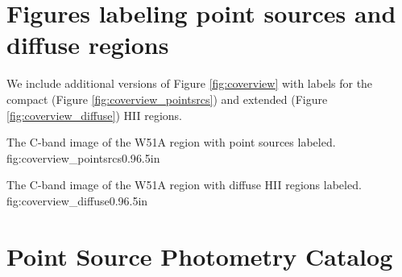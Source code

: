 

\appendix
\section{Figures labeling point sources and diffuse regions}
We include additional versions of Figure \ref{fig:coverview} with labels for
the compact (Figure \ref{fig:coverview_pointsrcs}) and extended (Figure
\ref{fig:coverview_diffuse}) HII regions.

{The C-band image of the W51A region with point sources labeled.}
{fig:coverview_pointsrcs}{0.9}{6.5in}

{The C-band image of the W51A region with diffuse HII regions labeled.}
{fig:coverview_diffuse}{0.9}{6.5in}

%

\section{Point Source Photometry Catalog}





